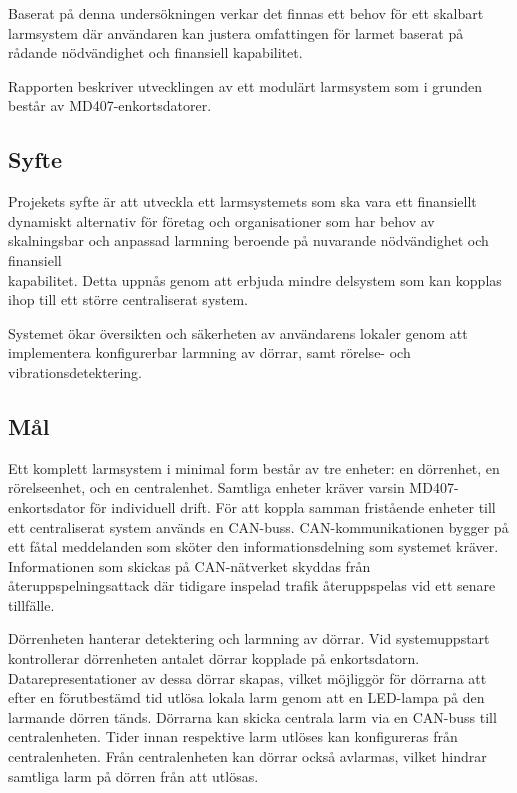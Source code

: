 \documentclass{article}
\begin{document}
Baserat på denna undersökningen verkar det finnas ett behov för ett skalbart larmsystem där användaren kan justera omfattingen för larmet baserat på rådande nödvändighet och finansiell kapabilitet.

Rapporten beskriver utvecklingen av ett modulärt larmsystem som i grunden består av MD407-enkortsdatorer\cite{MD407}.

\subsection{Syfte} %
Projekets syfte är att utveckla ett larmsystemets som ska vara ett finansiellt dynamiskt alternativ för företag
och organisationer som har behov av skalningsbar och anpassad larmning beroende på nuvarande nödvändighet och finansiell \\ kapabilitet.
Detta uppnås genom att erbjuda mindre delsystem som kan kopplas ihop till ett större centraliserat system.

Systemet ökar översikten och säkerheten av användarens lokaler genom att implementera konfigurerbar larmning av dörrar, samt rörelse- och vibrationsdetektering.

\subsection{Mål} %
Ett komplett larmsystem i minimal form består av tre enheter: en dörrenhet, en rörelseenhet, och en centralenhet.
Samtliga enheter kräver varsin MD407-enkortsdator för individuell drift. För att koppla samman
fristående enheter till ett centraliserat system används en CAN-buss.
CAN-kommunikationen bygger på ett fåtal meddelanden som sköter den informationsdelning som systemet kräver. Informationen som skickas på CAN-nätverket skyddas från återuppspelningsattack där tidigare inspelad trafik återuppspelas vid ett senare tillfälle.

Dörrenheten hanterar detektering och larmning av dörrar. Vid systemuppstart kontrollerar
dörrenheten antalet dörrar kopplade på enkortsdatorn. Datarepresentationer av dessa dörrar skapas, vilket möjliggör för dörrarna att efter en förutbestämd tid utlösa lokala larm genom att en LED-lampa på den larmande dörren tänds.
Dörrarna kan skicka centrala larm via en CAN-buss till centralenheten. Tider innan respektive larm utlöses kan konfigureras från centralenheten.
Från centralenheten kan dörrar också avlarmas, vilket hindrar samtliga larm på dörren från att utlösas.
\end{document}
